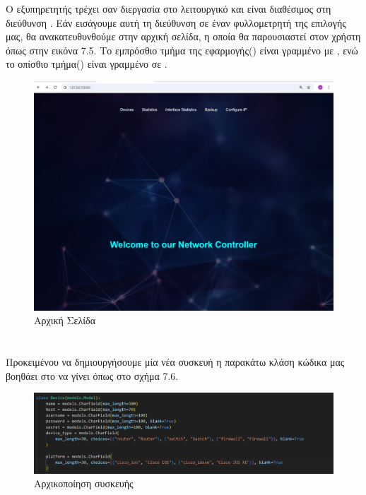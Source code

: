 \FloatBarrier



Ο εξυπηρετητής τρέχει σαν διεργασία στο λειτουργικό
και είναι διαθέσιμος στη διεύθυνση . Εάν εισάγουμε αυτή τη διεύθυνση σε έναν 
φυλλομετρητή της επιλογής μας, θα ανακατευθυνθούμε 
στην αρχική σελίδα, η οποία θα παρουσιαστεί στον 
χρήστη όπως στην εικόνα 7.5. Το εμπρόσθιο τμήμα της εφαρμογής() 
είναι γραμμένο με , ενώ το οπίσθιο τμήμα() 
είναι γραμμένο σε .

\FloatBarrier
\begin{figure}[h]
	\centering
	\includegraphics[width=1.2\textwidth]{graphics/home_page.png}
	\caption{ Αρχική Σελίδα}
\end{figure}

\FloatBarrier %

\section{}

Προκειμένου να δημιουργήσουμε μία νέα συσκευή η παρακάτω κλάση
κώδικα μας βοηθάει στο να γίνει όπως στο σχήμα 7.6.

\FloatBarrier
\begin{figure}[htb]
	\centering
	\includegraphics[width=1.2\textwidth]{graphics/class_device.png}
	\caption{Αρχικοποίηση συσκευής}
\end{figure}

